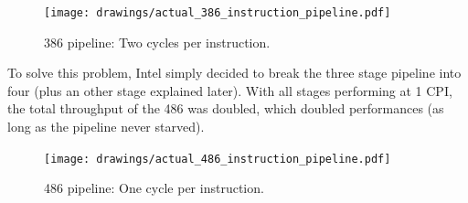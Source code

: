 \begin{figure}[H]
\centering
\texttt{[image: drawings/actual\_386\_instruction\_pipeline.pdf]}
\caption{386 pipeline: Two cycles per instruction.}

\end{figure}

\par
To solve this problem, Intel simply decided to break the three stage pipeline into four (plus an other stage explained later). With all stages performing at 1 CPI, the total throughput of the 486 was doubled, which doubled performances (as long as the pipeline never starved).\\
\begin{figure}[H]
\centering
\texttt{[image: drawings/actual\_486\_instruction\_pipeline.pdf]}
\caption{486 pipeline: One cycle per instruction.}
\end{figure}
\par





